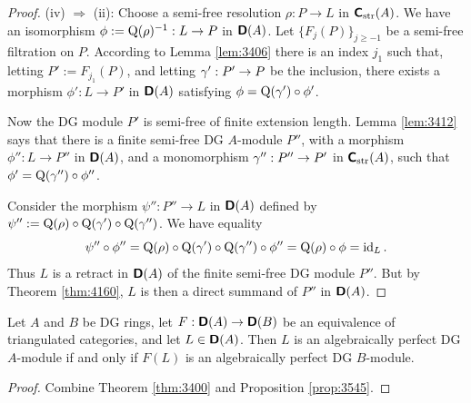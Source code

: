 \begin{proof}
\medskip \noindent 
(iv) $\Rightarrow$ (ii): 
Choose a semi-free resolution $\rho : P \to L$ in $\boldsymbol{\mathsf{C}}_{\mathrm{str}}(A)$.
We have an isomorphism 
$\phi := \operatorname{Q}(\rho)^{-1} : L \to P$
in $\boldsymbol{\mathsf{D}}(A)$. Let $\{ F_j(P) \}_{j \geq -1}$ be a semi-free filtration on 
$P$. According to Lemma \ref{lem:3406} there is an index $j_1$ such that, 
letting $P' := F_{j_1}(P)$, and letting $\gamma' : P' \to P$ be the inclusion, 
there exists a morphism $\phi' : L \to P'$ in $\boldsymbol{\mathsf{D}}(A)$ satisfying 
$\phi = \operatorname{Q}(\gamma') \circ \phi'$. 

Now the DG module $P'$ is semi-free of finite extension length. Lemma 
\ref{lem:3412} says that there is a  finite semi-free DG $A$-module $P''$, with 
a morphism $\phi'' : L \to P''$ in $\boldsymbol{\mathsf{D}}(A)$, and a monomorphism 
$\gamma'' : P'' \to P'$ in $\boldsymbol{\mathsf{C}}_{\mathrm{str}}(A)$, such that 
$\phi' = \operatorname{Q}(\gamma'') \circ \phi''$. 

Consider the morphism 
$\psi'' : P'' \to L$
in $\boldsymbol{\mathsf{D}}(A)$ defined by 
$\psi'' := \operatorname{Q}(\rho) \circ \operatorname{Q}(\gamma') \circ \operatorname{Q}(\gamma'')$.
We have equality 
\[ \psi'' \circ \phi'' = 
\operatorname{Q}(\rho) \circ \operatorname{Q}(\gamma') \circ \operatorname{Q}(\gamma'') \circ \phi'' = 
\operatorname{Q}(\rho) \circ \phi =  \operatorname{id}_L . \]
Thus $L$ is a retract in $\boldsymbol{\mathsf{D}}(A)$ of the finite semi-free DG module $P''$. 
But by Theorem \ref{thm:4160}, $L$ is then a direct summand of $P''$ in
$\boldsymbol{\mathsf{D}}(A)$.
\end{proof}

\begin{cor} \label{cor:3480}
Let $A$ and $B$ be DG rings, let 
$F : \boldsymbol{\mathsf{D}}(A) \to \boldsymbol{\mathsf{D}}(B)$ 
be an equivalence of triangulated categories, and let 
$L \in \boldsymbol{\mathsf{D}}(A)$. Then $L$ is an algebraically perfect DG $A$-module if and 
only if $F(L)$ is an algebraically perfect DG $B$-module.
\end{cor}

\begin{proof}
Combine Theorem \ref{thm:3400} and Proposition \ref{prop:3545}. 
\end{proof}

